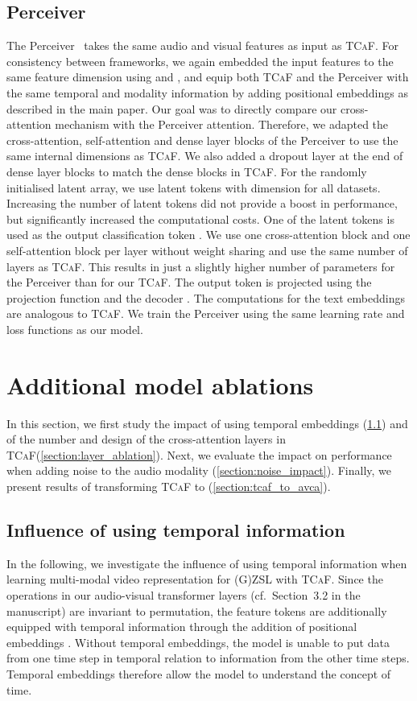 \documentclass[runningheads]{llncs}
\newcommand{\modelName}{\textsc{TCaF}\xspace}
\begin{document}
\subsection{Perceiver}
The Perceiver~\cite{jaegle2021perceiver} takes the same audio and visual features as input as \modelName. For consistency between frameworks, we again embedded the input features to the same feature dimension using  and , and equip both \modelName and the Perceiver with the same temporal and modality information by adding positional embeddings as described in the main paper. Our goal was to directly compare our cross-attention mechanism with the Perceiver attention.
Therefore, we adapted the cross-attention, self-attention and dense layer blocks of the Perceiver to use the same internal dimensions as \modelName. We also added a dropout layer at the end of dense layer blocks to match the dense blocks in \modelName. For the randomly initialised latent array, we use  latent tokens with dimension  for all datasets. Increasing the number of latent tokens did not provide a boost in performance, but significantly increased the computational costs. One of the latent tokens is used as the output classification token . We use one cross-attention block and one self-attention block per layer without weight sharing and use the same number of layers as \modelName. This results in just a slightly higher number of parameters for the Perceiver than for our \modelName. The output token  is  projected using the projection function  and the decoder . The computations for the text embeddings are analogous to \modelName. We train the Perceiver using the same learning rate and loss functions as our model. 


\section{Additional model ablations}\label{section:supp_ablations}

In this section, we first study the impact of using temporal embeddings (\cref{section:embeddings}) and of the number and design of the cross-attention layers in \modelName (\cref{section:layer_ablation}).
Next, we evaluate the impact on performance when adding noise to the audio modality (\cref{section:noise_impact}).
Finally, we present results of transforming \modelName to \cite{mercea2022} (\cref{section:tcaf_to_avca}). 


\subsection{Influence of using temporal information}
\label{section:embeddings}
In the following, we investigate the influence of using temporal information when learning multi-modal video representation for (G)ZSL with \modelName. Since the operations in our audio-visual transformer layers (cf.\ Section~3.2 in the manuscript) are invariant to permutation, the feature tokens are additionally equipped with temporal information through the addition of positional embeddings . Without temporal embeddings, the model is unable to put data from one time step in temporal relation to information from the other time steps. Temporal embeddings therefore allow the model to understand the concept of time. 
\end{document}
